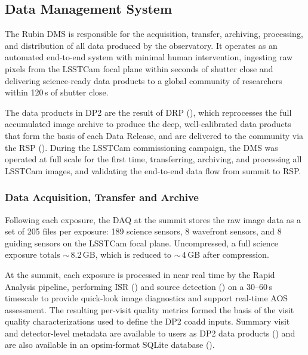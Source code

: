 \subsection{Data Management System}
\label{ssec:data processing}
%
The Rubin \gls{DMS} is responsible for the acquisition, transfer, archiving, processing, and distribution of all data produced by the observatory.
It operates as an automated end-to-end system with minimal human intervention,  ingesting raw pixels from the \gls{LSSTCam} focal plane within seconds of shutter close and delivering science-ready data products to a global community of researchers within 120\,s of shutter close.

The data products in \gls{DP2} are the result of \gls{DRP} (), which reprocesses the full accumulated image archive to produce the deep, well-calibrated data products that form the basis of each Data Release,  and are delivered to the community via the \gls{RSP} ().
During the \gls{LSSTCam} commissioning campaign, the \gls{DMS} was operated at full scale for the first time, transferring, archiving, and processing all \gls{LSSTCam} images,  and validating the end-to-end data flow from summit to \gls{RSP}.

\subsubsection{Data Acquisition, Transfer and Archive}
\label{ssec:dataacq}
Following each exposure, the \gls{DAQ} at the summit stores the raw image data as a set of 205 files per exposure: 189 science sensors, 8 wavefront sensors, and 8 guiding sensors on the \gls{LSSTCam} focal plane.
Uncompressed, a full science exposure totals $\sim$\,8.2\,\gls{GB}, which is reduced to $\sim$\,4\,\gls{GB} after compression.

At the summit, each exposure is processed in near real time by the Rapid Analysis \gls{pipeline}, performing \gls{ISR} () and source detection () on a 30--60\,s timescale to provide quick-look image diagnostics and support real-time \gls{AOS} assessment.
The resulting per-visit quality metrics formed the basis of the visit quality characterizations used to define the \gls{DP2} coadd inputs.
Summary visit and detector-level metadata are available to users as \gls{DP2} data products () and are also available in an opsim-format SQLite database ().

